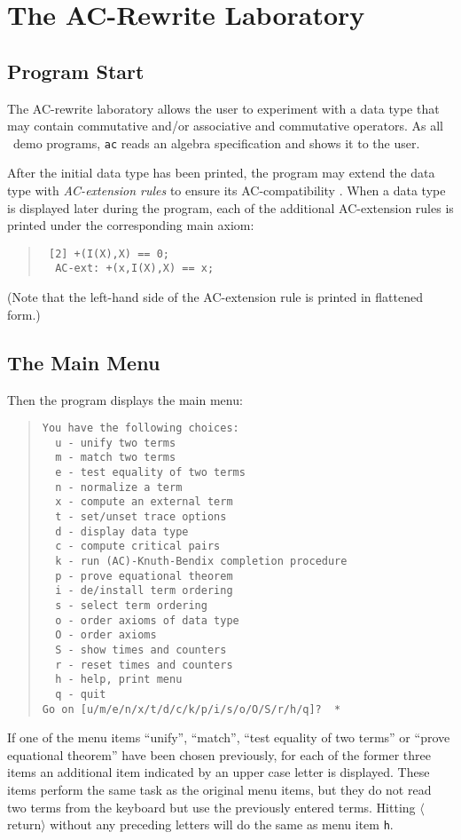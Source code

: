 \section{The AC-Rewrite Laboratory}
\subsection{Program Start}
The AC-rewrite laboratory allows the user to experiment with
a data type that may contain commutative and/or 
associative and commutative operators.
As all \redux\  demo programs, {\tt ac} reads an algebra specification
and shows it to the user.

After the initial data type has been printed, the program
may extend the data type with {\em AC-extension rules} to
ensure its AC-compatibility \cite{PetersonStickel:81}.  
When a data type is displayed later during the program, each of the additional
AC-extension rules is printed under the corresponding main axiom:
\begin{quote}
\begin{verbatim}
 [2] +(I(X),X) == 0;
  AC-ext: +(x,I(X),X) == x;
\end{verbatim}
\end{quote}
(Note that the left-hand side of the AC-extension rule is printed
in flattened form.)

\subsection{The Main Menu}
Then the program displays the main menu: 

\begin{quote}
\begin{verbatim}
You have the following choices: 
  u - unify two terms 
  m - match two terms 
  e - test equality of two terms 
  n - normalize a term
  x - compute an external term
  t - set/unset trace options
  d - display data type
  c - compute critical pairs
  k - run (AC)-Knuth-Bendix completion procedure
  p - prove equational theorem
  i - de/install term ordering
  s - select term ordering
  o - order axioms of data type
  O - order axioms
  S - show times and counters
  r - reset times and counters
  h - help, print menu
  q - quit
Go on [u/m/e/n/x/t/d/c/k/p/i/s/o/O/S/r/h/q]?  *
\end{verbatim}
\end{quote}

If one of the menu items ``unify'', ``match'', ``test equality of two terms''
or ``prove equational theorem''
have been chosen previously, for each of the former three items an additional
item indicated by an upper case letter is displayed. These
items perform the same task as the original menu items, but they 
do not read two terms from the keyboard but use the previously
entered terms. Hitting $\langle$return$\rangle$ without any preceding
letters will do the same as menu item {\tt h}.

